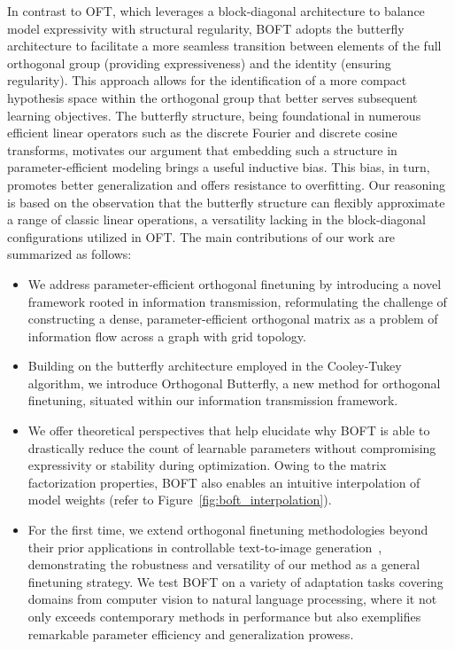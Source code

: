 In contrast to OFT, which leverages a block-diagonal architecture to balance model expressivity with structural regularity, BOFT adopts the butterfly architecture to facilitate a more seamless transition between elements of the full orthogonal group (providing expressiveness) and the identity (ensuring regularity). This approach allows for the identification of a more compact hypothesis space within the orthogonal group that better serves subsequent learning objectives. The butterfly structure, being foundational in numerous efficient linear operators such as the discrete Fourier and discrete cosine transforms, motivates our argument that embedding such a structure in parameter-efficient modeling brings a useful inductive bias. This bias, in turn, promotes better generalization and offers resistance to overfitting. Our reasoning is based on the observation that the butterfly structure can flexibly approximate a range of classic linear operations, a versatility lacking in the block-diagonal configurations utilized in OFT. The main contributions of our work are summarized as follows:

\begin{itemize}[leftmargin=*,nosep]
    \item We address parameter-efficient orthogonal finetuning by introducing a novel framework rooted in information transmission, reformulating the challenge of constructing a dense, parameter-efficient orthogonal matrix as a problem of information flow across a graph with grid topology.
    \item Building on the butterfly architecture employed in the Cooley-Tukey algorithm, we introduce Orthogonal Butterfly, a new method for orthogonal finetuning, situated within our information transmission framework.
    \item We offer theoretical perspectives that help elucidate why BOFT is able to drastically reduce the count of learnable parameters without compromising expressivity or stability during optimization. Owing to the matrix factorization properties, BOFT also enables an intuitive interpolation of model weights (refer to Figure~\ref{fig:boft_interpolation}).
    \item For the first time, we extend orthogonal finetuning methodologies beyond their prior applications in controllable text-to-image generation~\cite{qiu2023controlling}, demonstrating the robustness and versatility of our method as a general finetuning strategy. We test BOFT on a variety of adaptation tasks covering domains from computer vision to natural language processing, where it not only exceeds contemporary methods in performance but also exemplifies remarkable parameter efficiency and generalization prowess.
\end{itemize}

